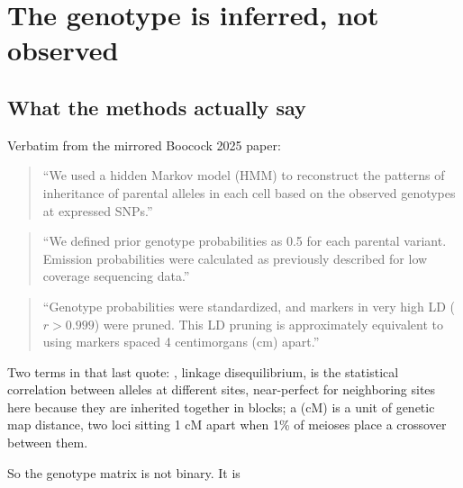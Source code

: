 
\section{The genotype is inferred, not observed}\label{sec:observed}

\subsection{What the methods actually say}

Verbatim from the mirrored Boocock 2025 paper:

\begin{quote}
\small
``We used a hidden Markov model (HMM) to reconstruct the patterns of inheritance of
parental alleles in each cell based on the observed genotypes at expressed SNPs.''
\end{quote}

\begin{quote}
\small
``We defined prior genotype probabilities as 0.5 for each parental variant. Emission
probabilities were calculated as previously described for low coverage sequencing data.''
\end{quote}

\begin{quote}
\small
``Genotype probabilities were standardized, and markers in very high LD ($r > 0.999$) were
pruned. This LD pruning is approximately equivalent to using markers spaced 4 centimorgans
(cm) apart.''
\end{quote}

Two terms in that last quote: , linkage disequilibrium, is the statistical
correlation between alleles at different sites, near-perfect for neighboring sites here
because they are inherited together in blocks; a  (cM) is a unit of
genetic map distance, two loci sitting 1 cM apart when 1\% of meioses place a crossover
between them.

So the genotype matrix is not binary. It is

